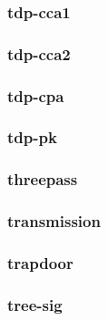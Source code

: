\begin{frame}\frametitle{tdp-cca1}
\begin{figure}
\begin{center}

\end{center}
\end{figure}
\end{frame}
\begin{frame}\frametitle{tdp-cca2}
\begin{figure}
\begin{center}

\end{center}
\end{figure}
\end{frame}
\begin{frame}\frametitle{tdp-cpa}
\begin{figure}
\begin{center}

\end{center}
\end{figure}
\end{frame}
\begin{frame}\frametitle{tdp-pk}
\begin{figure}
\begin{center}

\end{center}
\end{figure}
\end{frame}
\begin{frame}\frametitle{threepass}
\begin{figure}
\begin{center}

\end{center}
\end{figure}
\end{frame}
\begin{frame}\frametitle{transmission}
\begin{figure}
\begin{center}

\end{center}
\end{figure}
\end{frame}
\begin{frame}\frametitle{trapdoor}
\begin{figure}
\begin{center}

\end{center}
\end{figure}
\end{frame}
\begin{frame}\frametitle{tree-sig}
\begin{figure}
\begin{center}

\end{center}
\end{figure}
\end{frame}
